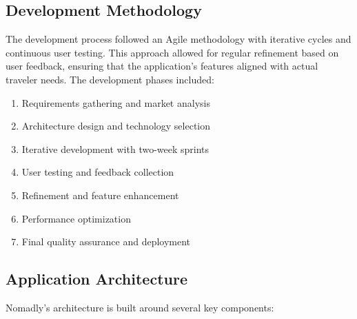 \documentclass[11pt, a4paper]{article}
\begin{document}
\subsection{Development Methodology}

The development process followed an Agile methodology with iterative cycles and continuous user testing. This approach allowed for regular refinement based on user feedback, ensuring that the application's features aligned with actual traveler needs. The development phases included:

\begin{enumerate}
    \item Requirements gathering and market analysis
    \item Architecture design and technology selection
    \item Iterative development with two-week sprints
    \item User testing and feedback collection
    \item Refinement and feature enhancement
    \item Performance optimization
    \item Final quality assurance and deployment
\end{enumerate}

\subsection{Application Architecture}

Nomadly's architecture is built around several key components:
\end{document}

